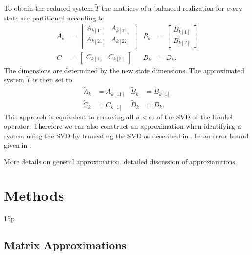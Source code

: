 \documentclass[doctype=mastersthesis,BCOR=15mm,biblatex]{ldvbook}%
\begin{document}
To obtain the reduced system $\tilde{T}$ the matrices of a balanced realization for every state are partitioned according to
\begin{align}
	A_k &=\begin{bmatrix}
	A_{k[11]} & A_{k[12]} \\
	A_{k[21]} & A_{k[22]} \\
	\end{bmatrix}
	&
	B_k &= \begin{bmatrix}
	B_{k[1]} \\ B_{k[2]}
	\end{bmatrix} 
	\\
	C &= \begin{bmatrix}
	C_{k[1]} & C_{k[2]}
	\end{bmatrix}& 
	D_k&=D_k.
\end{align}
The dimensions are determined by the new state dimensions.
The approximated system $\tilde{T}$ is then set to
\begin{align}
	\tilde{A}_k &= A_{k[11]}  & \tilde{B}_k &= B_{k[1]}\\
	\tilde{C}_k &=C_{k[1]}      & \tilde{D}_k &= D_k.
\end{align}
This approach is equivalent to removing all $\sigma<\epsilon$s of the SVD of the Hankel operator.
Therefore we can also construct an approximation when identifying a system using the SVD by truncating the SVD as described in \cite{shokoohi_identification_1987}.
In an error bound given in \cite{sandberg_balanced_2004}.

More details on general approximation.
\cite{antoulas_approximation_2005} detailed discussion of approxiamtions.

\chapter{Methods} 15p

\section{Matrix Approximations}
\end{document}
